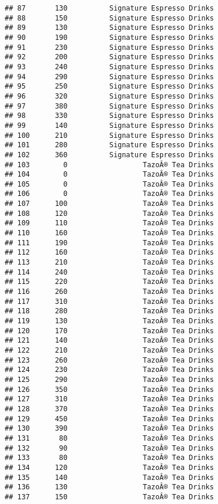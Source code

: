 \documentclass[
]{article}
\begin{document}
\begin{verbatim}
## 87       130          Signature Espresso Drinks
## 88       150          Signature Espresso Drinks
## 89       130          Signature Espresso Drinks
## 90       190          Signature Espresso Drinks
## 91       230          Signature Espresso Drinks
## 92       200          Signature Espresso Drinks
## 93       240          Signature Espresso Drinks
## 94       290          Signature Espresso Drinks
## 95       250          Signature Espresso Drinks
## 96       320          Signature Espresso Drinks
## 97       380          Signature Espresso Drinks
## 98       330          Signature Espresso Drinks
## 99       140          Signature Espresso Drinks
## 100      210          Signature Espresso Drinks
## 101      280          Signature Espresso Drinks
## 102      360          Signature Espresso Drinks
## 103        0                  TazoÂ® Tea Drinks
## 104        0                  TazoÂ® Tea Drinks
## 105        0                  TazoÂ® Tea Drinks
## 106        0                  TazoÂ® Tea Drinks
## 107      100                  TazoÂ® Tea Drinks
## 108      120                  TazoÂ® Tea Drinks
## 109      110                  TazoÂ® Tea Drinks
## 110      160                  TazoÂ® Tea Drinks
## 111      190                  TazoÂ® Tea Drinks
## 112      160                  TazoÂ® Tea Drinks
## 113      210                  TazoÂ® Tea Drinks
## 114      240                  TazoÂ® Tea Drinks
## 115      220                  TazoÂ® Tea Drinks
## 116      260                  TazoÂ® Tea Drinks
## 117      310                  TazoÂ® Tea Drinks
## 118      280                  TazoÂ® Tea Drinks
## 119      130                  TazoÂ® Tea Drinks
## 120      170                  TazoÂ® Tea Drinks
## 121      140                  TazoÂ® Tea Drinks
## 122      210                  TazoÂ® Tea Drinks
## 123      260                  TazoÂ® Tea Drinks
## 124      230                  TazoÂ® Tea Drinks
## 125      290                  TazoÂ® Tea Drinks
## 126      350                  TazoÂ® Tea Drinks
## 127      310                  TazoÂ® Tea Drinks
## 128      370                  TazoÂ® Tea Drinks
## 129      450                  TazoÂ® Tea Drinks
## 130      390                  TazoÂ® Tea Drinks
## 131       80                  TazoÂ® Tea Drinks
## 132       90                  TazoÂ® Tea Drinks
## 133       80                  TazoÂ® Tea Drinks
## 134      120                  TazoÂ® Tea Drinks
## 135      140                  TazoÂ® Tea Drinks
## 136      130                  TazoÂ® Tea Drinks
## 137      150                  TazoÂ® Tea Drinks

\end{verbatim}
\end{document}
